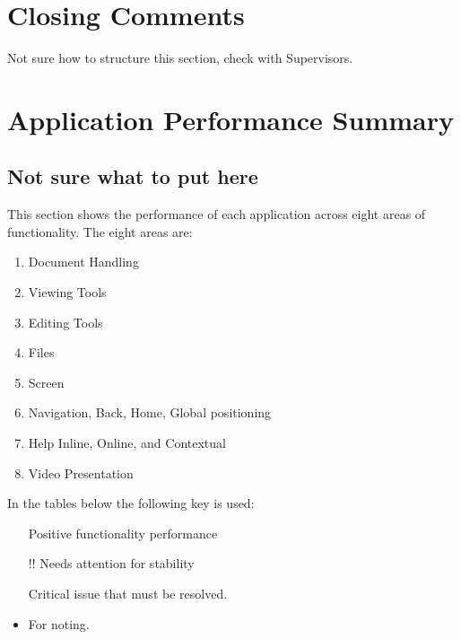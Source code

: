 \section{Closing Comments}
\color{yellow} Not sure how to structure this section, check with Supervisors.
\color{black}



\section{Application Performance Summary}
\subsection{Not sure what to put here}
This section shows the performance of each application across eight areas of functionality. The eight areas are:
\begin{enumerate}
    \item Document Handling
    \item Viewing Tools
    \item Editing Tools
    \item Files
    \item Screen
    \item Navigation, Back, Home, Global positioning
    \item Help Inline, Online, and Contextual
    \item Video Presentation
    
    
\end{enumerate}

In the tables below the following key is used:
\begin{itemize}
\item[\color{green}\tick]\color{black } Positive functionality performance
    \item [\color{amber}!!]\color{black} Needs attention for stability
     \item [\color{red}\cross]\color{black} Critical issue that must be resolved.
     \item For noting.
\end{itemize}
